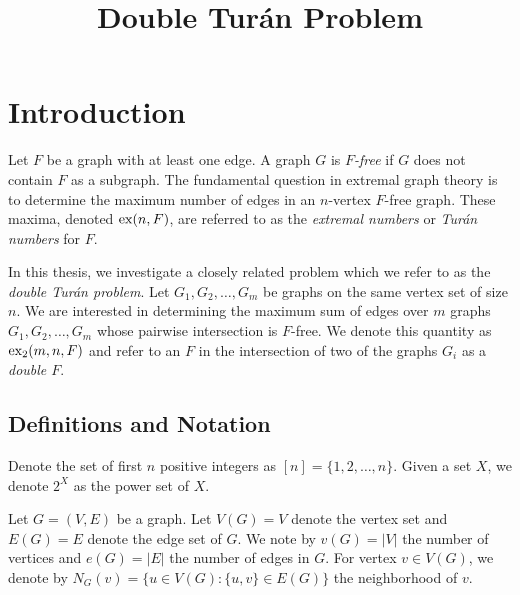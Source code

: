 \documentclass[10pt, reqno]{report}
\title{Double Turán Problem}
\newcommand*{\ex}{\textnormal{ex}}
\newcommand*{\dex}{\textnormal{ex}_2}
\begin{document}
\maketitle



\tableofcontents

\chapter{Introduction}

Let $F$ be a graph with at least one edge. A graph $G$ is \textit{$F$-free} if $G$ does not contain $F$ as a subgraph. The fundamental question in extremal graph theory is to determine the maximum number of edges in an $n$-vertex $F$-free graph. These maxima, denoted $\ex(n, F)$, are referred to as the \textit{extremal numbers} or \textit{Turán numbers} for $F$.

In this thesis, we investigate a closely related problem which we refer to as the \textit{double Turán problem}. Let $G_1, G_2, \ldots, G_m$ be graphs on the same vertex set of size $n$. We are interested in determining the maximum sum of edges over $m$ graphs $G_1, G_2, \ldots, G_m$ whose pairwise intersection is $F$-free. We denote this quantity as $\dex(m, n, F)$ and refer to an $F$ in the intersection of two of the graphs $G_i$ as a \textit{double $F$}. 

\section{Definitions and Notation}

Denote the set of first $n$ positive integers as $[n] = \{1, 2, \ldots, n\}$. Given a set $X$, we denote $2^X$ as the power set of $X$.

Let $G = (V, E)$ be a graph. Let $V(G) = V$ denote the vertex set and $E(G) = E$ denote the edge set of $G$. We note by $v(G) = |V|$ the number of vertices and $e(G) = |E|$ the number of edges in $G$. For vertex $v \in V(G)$, we denote by $N_G(v) = \{u \in V(G) : \{u, v\} \in E(G)\}$ the neighborhood of $v$.
\end{document}
